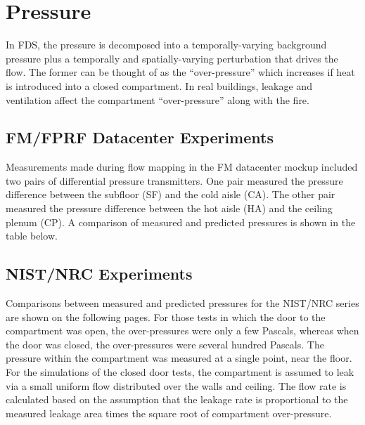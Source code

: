 
\chapter{Pressure}

In FDS, the pressure is decomposed into a temporally-varying background pressure plus a temporally and spatially-varying perturbation that drives the flow. The former can be thought of as the ``over-pressure'' which increases if heat is introduced into a closed compartment. In real buildings, leakage and ventilation affect the compartment ``over-pressure'' along with the fire.

\section{FM/FPRF Datacenter Experiments}

Measurements made during flow mapping in the FM datacenter mockup included two pairs of differential pressure transmitters. One pair measured the pressure difference between the subfloor (SF) and the cold aisle (CA).  The other pair measured the pressure difference between the hot aisle (HA) and the ceiling plenum (CP). A comparison of measured and predicted pressures is shown in the table below.


\section{NIST/NRC Experiments}

Comparisons between measured and predicted pressures for the NIST/NRC series are shown on the following pages. For those tests in which the door to the compartment was open, the over-pressures were only a few Pascals, whereas when the door was closed, the over-pressures were several hundred Pascals. The pressure within the compartment was measured at a single point, near the floor. For the simulations of the closed door tests, the compartment is assumed to leak via a small uniform flow distributed over the walls and ceiling. The flow rate is calculated based on the assumption that the leakage rate is proportional to the measured leakage area times the square root of compartment over-pressure.

